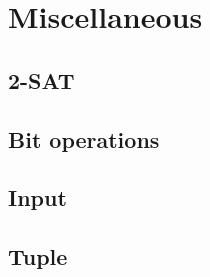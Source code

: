 \documentclass[a4paper, 11pt]{article}
\def\path{..}
\begin{document}
\clearpage
\section{Miscellaneous}
\subsection{2-SAT}


\clearpage
\subsection{Bit operations}


\subsection{Input}


\clearpage
\subsection{Tuple}

\end{document}

